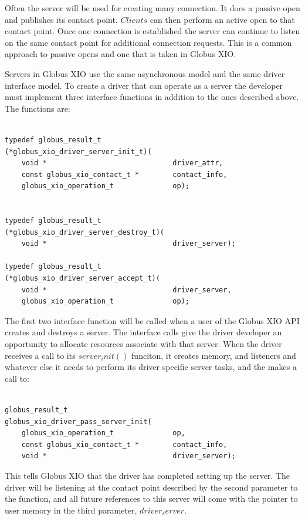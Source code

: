 \documentclass[11pt]{article}
\begin{document}
Often the server will be used for creating many connection.  It does a
passive open and publishes its contact point.  $Clients$ 
can then perform an active open to that contact point.  Once one connection
is established the server can continue to listen on the same contact point
for additional connection requests.  This is a common approach to
passive opens and one that is taken in Globus XIO.

Servers in Globus XIO use the same asynchronous model and the same driver
interface model.  To create a driver that can operate as a server the
developer must implement three interface functions in addition to the 
ones described above.  The functions are:

\begin{verbatim}

typedef globus_result_t
(*globus_xio_driver_server_init_t)(
    void *                              driver_attr,
    const globus_xio_contact_t *        contact_info,
    globus_xio_operation_t              op);


typedef globus_result_t
(*globus_xio_driver_server_destroy_t)(
    void *                              driver_server);

typedef globus_result_t
(*globus_xio_driver_server_accept_t)(
    void *                              driver_server,
    globus_xio_operation_t              op);

\end{verbatim}

The first two interface function will be called when a user of the Globus
XIO API creates and destroys a server.  The interface calls give the driver
developer an opportunity to allocate resources associate with that server.
When the driver receives a call to its $server_init()$ funciton, it 
creates memory, and listeners and whatever else it needs to perform
its driver specific server tasks, and the makes a call to:

\begin{verbatim}

globus_result_t
globus_xio_driver_pass_server_init(
    globus_xio_operation_t              op,
    const globus_xio_contact_t *        contact_info,
    void *                              driver_server);

\end{verbatim}

This tells Globus XIO that the driver has completed setting up the server.
The driver will be listening at the contact point described by the 
second parameter to the function, and all future references to this 
server will come with the pointer to user memory in the third parameter,
$driver_server$.
\end{document}
